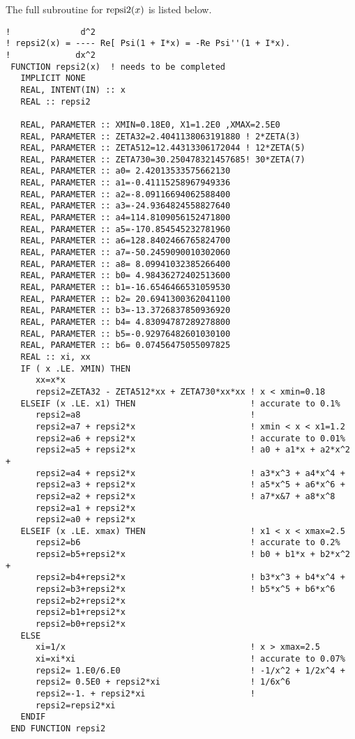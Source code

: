 \documentclass[preprint,12pt,eqsecnum,nofootinbib,amsmath,amssymb]{revtex4}
\begin{document}
\noindent
The full subroutine for ${\rm repsi2}(x)$ is listed below. 

{
\baselineskip12pt
\begin{verbatim}
!              d^2
! repsi2(x) = ---- Re[ Psi(1 + I*x) = -Re Psi''(1 + I*x). 
!             dx^2
 FUNCTION repsi2(x)  ! needs to be completed
   IMPLICIT NONE
   REAL, INTENT(IN) :: x
   REAL :: repsi2

   REAL, PARAMETER :: XMIN=0.18E0, X1=1.2E0 ,XMAX=2.5E0
   REAL, PARAMETER :: ZETA32=2.4041138063191880 ! 2*ZETA(3)
   REAL, PARAMETER :: ZETA512=12.44313306172044 ! 12*ZETA(5)
   REAL, PARAMETER :: ZETA730=30.250478321457685! 30*ZETA(7)
   REAL, PARAMETER :: a0= 2.42013533575662130
   REAL, PARAMETER :: a1=-0.41115258967949336
   REAL, PARAMETER :: a2=-8.09116694062588400
   REAL, PARAMETER :: a3=-24.9364824558827640
   REAL, PARAMETER :: a4=114.8109056152471800
   REAL, PARAMETER :: a5=-170.854545232781960
   REAL, PARAMETER :: a6=128.8402466765824700
   REAL, PARAMETER :: a7=-50.2459090010302060 
   REAL, PARAMETER :: a8= 8.09941032385266400
   REAL, PARAMETER :: b0= 4.98436272402513600
   REAL, PARAMETER :: b1=-16.6546466531059530
   REAL, PARAMETER :: b2= 20.6941300362041100
   REAL, PARAMETER :: b3=-13.3726837850936920 
   REAL, PARAMETER :: b4= 4.83094787289278800 
   REAL, PARAMETER :: b5=-0.92976482601030100
   REAL, PARAMETER :: b6= 0.07456475055097825
   REAL :: xi, xx
   IF ( x .LE. XMIN) THEN
      xx=x*x
      repsi2=ZETA32 - ZETA512*xx + ZETA730*xx*xx ! x < xmin=0.18
   ELSEIF (x .LE. x1) THEN                       ! accurate to 0.1%
      repsi2=a8                                  !
      repsi2=a7 + repsi2*x                       ! xmin < x < x1=1.2
      repsi2=a6 + repsi2*x                       ! accurate to 0.01% 
      repsi2=a5 + repsi2*x                       ! a0 + a1*x + a2*x^2 +
      repsi2=a4 + repsi2*x                       ! a3*x^3 + a4*x^4 +
      repsi2=a3 + repsi2*x                       ! a5*x^5 + a6*x^6 +
      repsi2=a2 + repsi2*x                       ! a7*x&7 + a8*x^8 
      repsi2=a1 + repsi2*x
      repsi2=a0 + repsi2*x 
   ELSEIF (x .LE. xmax) THEN                     ! x1 < x < xmax=2.5
      repsi2=b6                                  ! accurate to 0.2%
      repsi2=b5+repsi2*x                         ! b0 + b1*x + b2*x^2 +
      repsi2=b4+repsi2*x                         ! b3*x^3 + b4*x^4 +
      repsi2=b3+repsi2*x                         ! b5*x^5 + b6*x^6
      repsi2=b2+repsi2*x          
      repsi2=b1+repsi2*x          
      repsi2=b0+repsi2*x          
   ELSE
      xi=1/x                                     ! x > xmax=2.5
      xi=xi*xi                                   ! accurate to 0.07%
      repsi2= 1.E0/6.E0                          ! -1/x^2 + 1/2x^4 + 
      repsi2= 0.5E0 + repsi2*xi                  ! 1/6x^6
      repsi2=-1. + repsi2*xi                     !
      repsi2=repsi2*xi
   ENDIF
 END FUNCTION repsi2
\end{verbatim}
}
\vskip1cm
\end{document}
